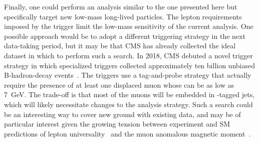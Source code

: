 Finally, one could perform an analysis similar to the one presented here but specifically target new low-mass long-lived particles. The lepton \pt requirements imposed by the trigger limit the low-mass sensitivity of the current analysis. One possible approach would be to adopt a different triggering strategy in the next data-taking period, but it may be that CMS has already collected the ideal dataset in which to perform such a search. In 2018, CMS debuted a novel trigger strategy in which specialized triggers collected approximately ten billion unbiased B-hadron-decay events~\cite{cms_b_parking}. The triggers use a tag-and-probe strategy that actually require the presence of at least one displaced muon whose \pt can be as low as \SI{7}{\GeV}. The trade-off is that most of the muons will be embedded in \cPqb-tagged jets, which will likely necessitate changes to the analysis strategy. Such a search could be an interesting way to cover new ground with existing data, and may be of particular interest given the growing tension between experiment and SM predictions of lepton universality~\cite{lhcb} and the muon anomalous magnetic moment~\cite{g_minus_two}.